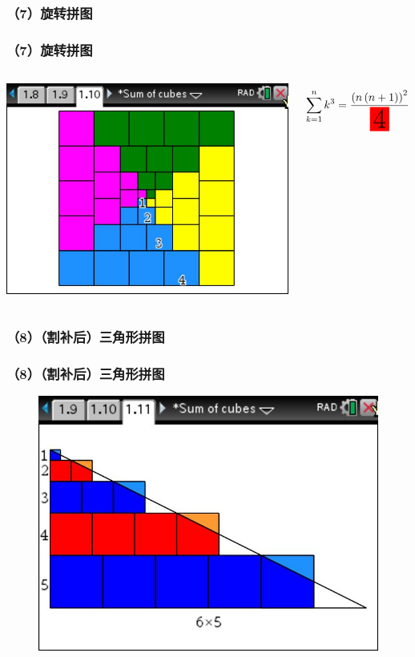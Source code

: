 \documentclass[aspectratio=169]{beamer}
\begin{document}
\subsubsection{（7）旋转拼图}
       \begin{frame}
       \frametitle{（7）旋转拼图}
       \begin{columns}
       	\includegraphics[scale=0.3]{旋转拼图.jpg}
       	
       	\[  \sum_{k=1}^{n} k^3= \frac{\left( n\left( n+1\right) \right) ^2}{ \colorbox{red}{{\Huge 4}} } \]
       \end{columns}      
   \end{frame}

\subsubsection{（8）（割补后）三角形拼图}
       \begin{frame}
      \frametitle{（8）（割补后）三角形拼图}
      \begin{figure}
      	\centering
      	\includegraphics[scale=0.3]{三角形拼图.jpg}
      \end{figure}
  \end{frame}
\end{document}
